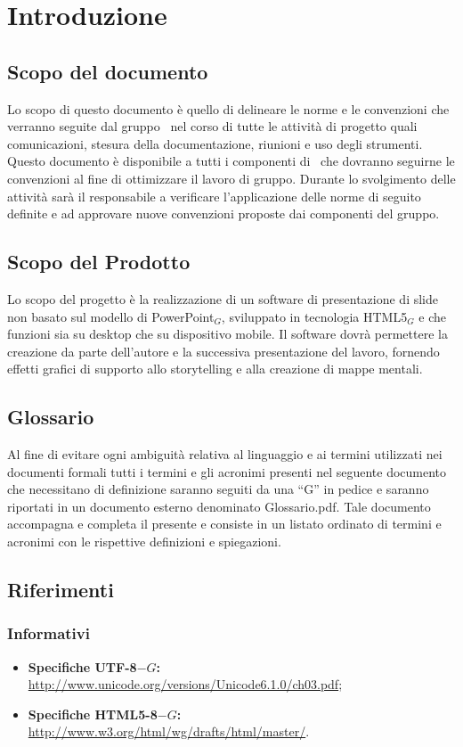 \section{Introduzione}

\subsection{Scopo del documento}
Lo scopo di questo documento è quello di delineare le norme e le convenzioni che verranno seguite dal gruppo \gruppo\ nel corso di tutte le attività di progetto quali comunicazioni, stesura della documentazione, riunioni e uso degli strumenti.
Questo documento è disponibile a tutti i componenti di \gruppo\ che dovranno seguirne le convenzioni al fine di ottimizzare il lavoro di gruppo.
Durante lo svolgimento delle attività sarà il responsabile a verificare l’applicazione delle norme di seguito definite e ad approvare nuove convenzioni proposte dai componenti del gruppo.

\subsection{Scopo del Prodotto}
Lo scopo del progetto è la realizzazione di un software di presentazione di slide non basato sul modello di PowerPoint$_G$, sviluppato in tecnologia HTML5$_G$ e che funzioni sia su desktop che su dispositivo mobile. Il software dovrà permettere la creazione da parte dell'autore e la successiva presentazione del lavoro, fornendo effetti grafici di supporto allo storytelling e alla creazione di mappe mentali. 

\subsection{Glossario}
Al fine di evitare ogni ambiguità relativa al linguaggio e ai termini utilizzati nei documenti formali tutti i termini e gli acronimi presenti nel seguente documento che necessitano di definizione saranno seguiti da una ``G'' in pedice e saranno riportati in un documento esterno denominato Glossario.pdf. Tale documento accompagna e completa il presente e consiste in un listato ordinato di termini e acronimi con le rispettive definizioni e spiegazioni.

\subsection{Riferimenti}
\subsubsection{Informativi}
\begin{itemize}
	\item \textbf{Specifiche UTF-8$-G$:} \href{http://www.unicode.org/versions/Unicode6.1.0/ch03.pdf}{http://www.unicode.org/versions/Unicode6.1.0/ch03.pdf};
	\item \textbf{Specifiche HTML5-8$-G$:} \href{http://www.w3.org/html/wg/drafts/html/master/}{http://www.w3.org/html/wg/drafts/html/master/}.
\end{itemize}